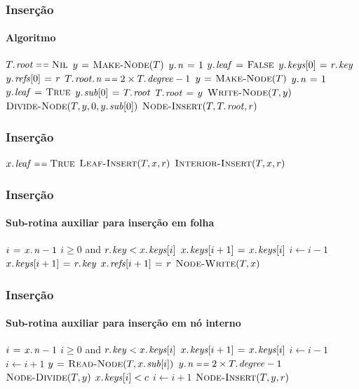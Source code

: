 \documentclass{beamer}
\begin{document}
\begin{frame}
\frametitle{Inserção}
\framesubtitle{Algoritmo}

{
\begin{codebox}
\li \If $\attrib{T}{root} \isequal \const{Nil}$
\li \Then $y \mathrel{\hspace{1pt}=\hspace{1pt}} \textnormal{\scshape Make-Node}(T)$
\li   $\attrib{y}{n} \gets 1$
\li   $\attrib{y}{leaf} \gets \const{False}$
\li   $\attrib{y}{keys}[0] \gets \attrib{r}{key}$
\li   $\attrib{y}{refs}[0] \gets r$
\li \ElseIf $\attrib{\attrib{T}{root}}{n} \isequal 2 \times \attrib{T}{degree} - 1 $
\li   \Then $y \mathrel{\hspace{1pt}=\hspace{1pt}} \textnormal{\scshape Make-Node}(T)$
\li   $\attrib{y}{n} \gets 1$
\li   $\attrib{y}{leaf} \gets \const{True}$
\li   $\attrib{y}{sub}[0] \gets \attrib{T}{root}$
\li   $\attrib{T}{root} \gets y$
\li   $\textnormal{\scshape Write-Node}(T, y)$
\li   $\proc{Divide-Node}(T, y, 0, \attrib{y}{sub}[0])$
    \End
\li $\proc{Node-Insert}(T, \attrib{T}{root}, r)$
\end{codebox}
}
\end{frame}

\begin{frame}
\frametitle{Inserção}

{
\begin{codebox}
\li \If $\attrib{x}{leaf} \isequal \const{True}$
\li \Then $\textnormal{\scshape Leaf-Insert}(T, x, r)$
\li \Else $\textnormal{\scshape Interior-Insert}(T, x, r)$
    \End
\end{codebox}
}
\end{frame}

\begin{frame}
\frametitle{Inserção}
\framesubtitle{Sub-rotina auxiliar para inserção em folha}
{
\begin{codebox}
\li $i \gets \attrib{x}{n}-1$
\li \While $i \ge 0$ and $\attrib{r}{key} < \attrib{x}{keys}[i]$
\li \Do $\attrib{x}{keys}[i+1] \gets \attrib{x}{keys}[i]$
\li   $i \gets i - 1$
    \End
\li $\attrib{x}{keys}[i+1] \gets \attrib{r}{key}$
\li $\attrib{x}{refs}[i+1] \gets r$
\li $\textnormal{\scshape Node-Write}(T, x)$
\end{codebox}
}
\end{frame}

\begin{frame}
\frametitle{Inserção}
\framesubtitle{Sub-rotina auxiliar para inserção em nó interno}

{
\begin{codebox}
\li $i \gets \attrib{x}{n}-1$
\li \While $i \ge 0$ and $\attrib{r}{key} < \attrib{x}{keys}[i]$
\li \Do $\attrib{x}{keys}[i+1] \gets \attrib{x}{keys}[i]$
\li   $i \gets i - 1$
    \End
\li $i \gets i + 1$
\li $y \gets \proc{Read-Node}(T, \attrib{x}{sub}[i])$
\li \If $\attrib{y}{n} \isequal 2 \times \attrib{T}{degree} - 1$
\li \Then $\textnormal{\scshape Node-Divide}(T, y)$
\li   \If $\attrib{x}{keys}[i] < c$
\li   \Then $i \gets i + 1$
      \End
    \End
\li $\textnormal{\scshape Node-Insert}(T, y, r)$
\end{codebox}
}
\end{frame}
\end{document}
